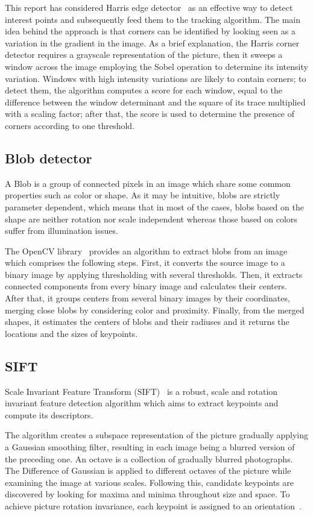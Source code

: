 \documentclass[journal]{IEEEtran}
\begin{document}
This report has considered Harris edge detector~\cite{harris1988combined} as an effective way to detect interest points and subsequently feed them to the tracking algorithm. The main idea behind the approach is that corners can be identified by looking seen as a variation in the gradient in the image. As a brief explanation, the Harris corner detector requires a grayscale representation of the picture, then it sweeps a window across the image employing the Sobel operation to determine its intensity variation. Windows with high intensity variations are likely to contain corners; to detect them, the algorithm computes a score for each window, equal to the difference between the window determinant and the square of its trace multiplied with a scaling factor; after that, the score is used to determine the presence of corners according to one threshold.

\subsection{Blob detector} 
A Blob is a group of connected pixels in an image which share some common properties such as color or shape. As it may be intuitive, blobs are strictly parameter dependent, which means that in most of the cases, blobs based on the shape are neither rotation nor scale independent whereas those based on colors suffer from illumination issues.

The OpenCV library~\cite{opencv_library} provides an algorithm to extract blobs from an image which comprises the following steps. First, it converts the source image to a binary image by applying thresholding with several thresholds. Then, it extracts connected components from every binary image and calculates their centers. After that, it groups centers from several binary images by their coordinates, merging close blobs by considering color and proximity. Finally, from the merged shapes, it estimates the centers of blobs and their radiuses and it returns the locations and the sizes of keypoints.

\subsection{SIFT}
Scale Invariant Feature Transform (SIFT)~\cite{lowe2004distinctive} is a robust, scale and rotation invariant feature detection algorithm which aims to extract keypoints and compute its descriptors. 

The algorithm creates a subspace representation of the picture gradually applying a Gaussian smoothing filter, resulting in each image being a blurred version of the preceding one.
An octave is a collection of gradually blurred photographs. The Difference of Gaussian is applied to different octaves of the picture while examining the image at various scales.
Following this, candidate keypoints are discovered by looking for maxima and minima throughout size and space. To achieve picture rotation invariance, each keypoint is assigned to an orientation~\cite{opencv_library}. 
\end{document}
